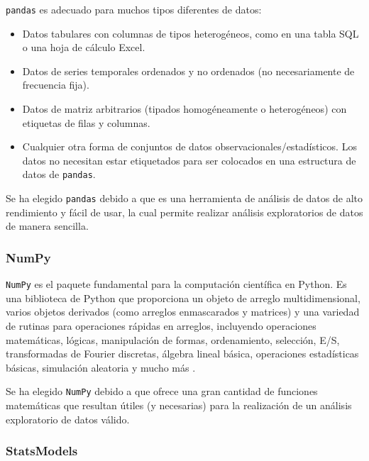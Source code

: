 \texttt{pandas} es adecuado para muchos tipos diferentes de datos:

\begin{itemize}
    \item Datos tabulares con columnas de tipos heterogéneos, como en una tabla
      SQL o una hoja de cálculo Excel.
    \item Datos de series temporales ordenados y no ordenados (no necesariamente
      de frecuencia fija).
    \item Datos de matriz arbitrarios (tipados homogéneamente o heterogéneos)
      con etiquetas de filas y columnas.
    \item Cualquier otra forma de conjuntos de datos observacionales/estadísticos.
      Los datos no necesitan estar etiquetados para ser colocados en una estructura
      de datos de \texttt{pandas}.
\end{itemize}

Se ha elegido \texttt{pandas} debido a que es una herramienta de análisis de
datos de alto rendimiento y fácil de usar, la cual permite realizar análisis
exploratorios de datos de manera sencilla.

\subsubsection{NumPy}

\texttt{NumPy} es el paquete fundamental para la computación científica en Python.
Es una biblioteca de Python que proporciona un objeto de arreglo multidimensional,
varios objetos derivados (como arreglos enmascarados y matrices) y una variedad de
rutinas para operaciones rápidas en arreglos, incluyendo operaciones matemáticas,
lógicas, manipulación de formas, ordenamiento, selección, E/S, transformadas de
Fourier discretas, álgebra lineal básica, operaciones estadísticas básicas,
simulación aleatoria y mucho más \cite{oliphant2006guide}.

Se ha elegido \texttt{NumPy} debido a que ofrece una gran cantidad de funciones
matemáticas que resultan útiles (y necesarias) para la realización de un
análisis exploratorio de datos válido.

\subsubsection{StatsModels}

